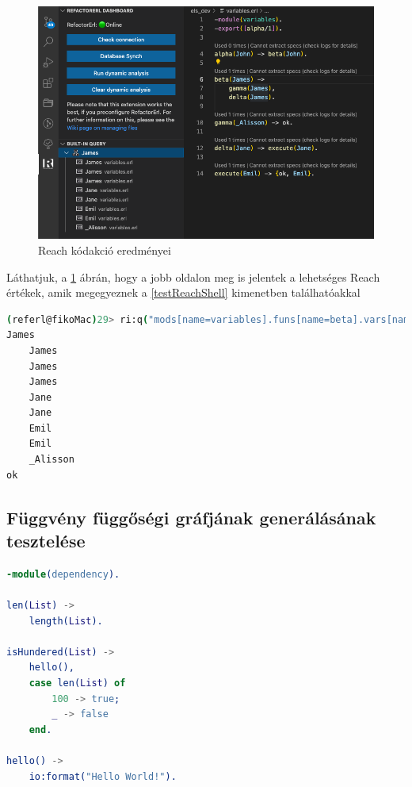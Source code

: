 \begin{figure}[H]
  \centering
  \includegraphics[width=0.9\linewidth]{images/testCases/testVarReach.png}
  \caption{Reach kódakció eredményei}
  \label{fig:testVarReach}
\end{figure}


Láthatjuk, a \ref{fig:testVarReach} ábrán, hogy a jobb oldalon meg is jelentek a lehetséges Reach értékek, amik megegyeznek a \ref{testReachShell} kimenetben találhatóakkal


\lstset{caption=Válltozó Origin értéke Shellből, label=src:sh} \label{testReachShell}
\begin{lstlisting}[language={sh}]  
(referl@fikoMac)29> ri:q("mods[name=variables].funs[name=beta].vars[name=James].bindings.reach"). 
James
    James
    James
    James
    Jane
    Jane
    Emil
    Emil
    _Alisson
ok
\end{lstlisting}


\subsection{Függvény függőségi gráfjának generálásának tesztelése}

 \label{testdependencyERL}
\begin{lstlisting}[language={erlang}]  
-module(dependency).

len(List) ->
    length(List).

isHundered(List) ->
    hello(),
    case len(List) of
        100 -> true;
        _ -> false
    end.

hello() ->
    io:format("Hello World!").
\end{lstlisting}


